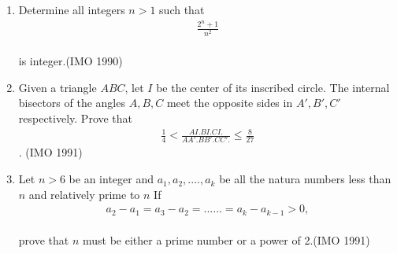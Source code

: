 \begin{enumerate}
	\item Determine all integers $n>1$  such that
		\begin{align*} \frac{{2^n}+1}{n^2}\end{align*}\\ is integer.\hfill(IMO 1990)


 \item Given a triangle $ABC$, let $I$ be the center of its inscribed circle. The internal bisectors of the angles $A, B, C$ meet the opposite sides in $A', B', C'$ respectively. Prove that
	 \begin{align*}\frac{1}{4} < \frac{AI. BI. CI.}{AA'. BB'. CC'.}\leq\frac{8}{27}\end{align*}. \hfill(IMO 1991)


\item Let $n > 6$ be an integer and $a_1, a_2,....,a_k $ be all the natura numbers less than $n$ and relatively prime to $n$ If \begin{align*}
a_2-a_1=a_3-a_2=......=a_k-a_{k-1} > 0,\end{align*}\\
       prove that $n$ must be either a prime number or a power of 2.\hfill(IMO 1991)
\end{enumerate}

